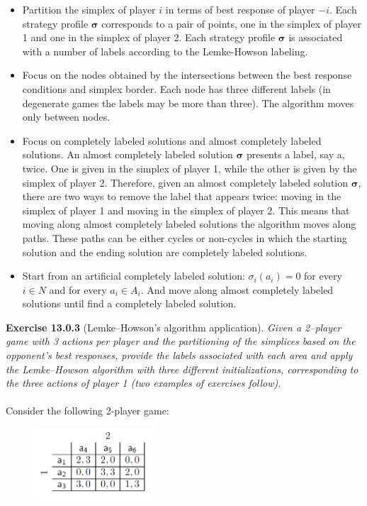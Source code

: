 \begin{itemize}
\item Partition the simplex of player $i$ in terms of best response of player $-i$. Each strategy profile $\mathbf{\sigma}$ corresponds
to a pair of points, one in the simplex of player 1 and one in the simplex of player 2. Each strategy profile $\mathbf{\sigma}$ is associated with a number of labels according to the Lemke-Howson labeling.
\item Focus on the nodes obtained by the intersections between the best response conditions and simplex border. Each node has three different labels (in degenerate games the labels may be more than three). The algorithm moves only between nodes.
\item Focus on completely labeled solutions and almost completely labeled solutions. An almost completely labeled solution $\mathbf{\sigma}$ presents a label, say \textsf{a}, twice. One is given in the simplex of player 1, while the other is given by the simplex of player 2. Therefore, given an almost completely labeled solution $\mathbf{\sigma}$, there are two ways to remove the label that appears twice: moving in the simplex of player 1 and moving in the
simplex of player 2. This means that moving along almost completely labeled solutions the algorithm moves along paths. These paths can be either cycles or non-cycles in which the starting solution and
the ending solution are completely labeled solutions.
\item Start from an artificial completely labeled solution: $\sigma_i (a_i) = 0$ for every $i \in N$ and for every $a_i \in A_i$.
And move along almost completely labeled solutions until find a completely labeled solution.
\end{itemize}
\textbf{Exercise 13.0.3} (Lemke–Howson’s algorithm application). \textit{Given a 2–player game with 3 actions per player and the partitioning of the simplices based on the opponent’s best responses, provide the labels associated with each area and apply the Lemke–Howson algorithm with three different initializations, corresponding to the three actions of player 1 (two examples of exercises follow).}\\\\
Consider the following 2-player game:
\begin{figure}[H]
\centering
\includegraphics[width=0.4\textwidth]{images/img_2_13_01.png}
\end{figure}

